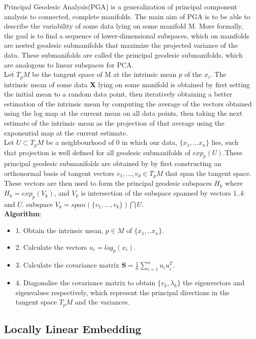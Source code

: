 \documentclass[12pt]{report}
\begin{document}
Principal Geodesic Analysis(PGA) is a generalization of principal component analysis to connected, 
complete manifolds. The main aim of PGA is to be able to 
describe the variability of some data lying on some manifold M. 
More formally, the goal is to find a sequence of lower-dimensional subspaces, 
which on manifolds are nested geodesic submanifolds that maximize the projected variance of the data. 
These submanifolds are called the principal geodesic submanifolds, 
which are analogous to linear subspaces for PCA.\\
Let $T_pM$ be the tangent space of M at the intrinsic mean $p$ of the $x_i$. The intrinsic mean of some data \textbf{X} lying on some manifold is obtained by first setting the initial mean to a random data point, then iteratively obtaining a better estimation of the intrinsic mean by computing the average of the vectors obtained using the log map at the current mean on all data points, then taking the next estimate of the intrinsic mean as the projection of that average using the exponential map at the current estimate.\\
Let $U \subset T_pM$ be a neighbourhood of 0 in which our data, $\{x_1,...x_n\}$ lies, such that projection is well defined for all geodesic submanifolds of $exp_p(U)$.These principal geodesic submanifolds are obtained by by first constructing an orthonormal basis of tangent vectors $v_1,...,v_d \in T_pM$ that span the tangent space. These vectors are then used to form the principal geodesic subspaces $H_k$ where $H_k = exp_p(V_k)$, and $V_k$ is intersection of the subspace spanned by vectors $1..k$ and $U$.
subspace $V_k = span(\{v_1,...,v_k\})\bigcap U$.\\
\textbf{Algorithm}:
\begin{itemize}
    \item 1. Obtain the intrinsic mean, $p \in M$ of $\{x_1,..x_n\}$.
    \item 2. Calculate the vectors $u_i = log_p(x_i)$.
    \item 3. Calculate the covariance matrix $\textbf{S} = \frac{1}{n} \sum^n_{i=1} u_iu_i^T$.
    \item 4. Diagonalise the covariance matrix to obtain $\{v_k, \lambda_k\}$ the eigenvectors and eigenvalues respectively, which represent the principal directions in the tangent space $T_pM$ and the variances.
\end{itemize}

\newpage

\subsection{Locally Linear Embedding}
\end{document}
